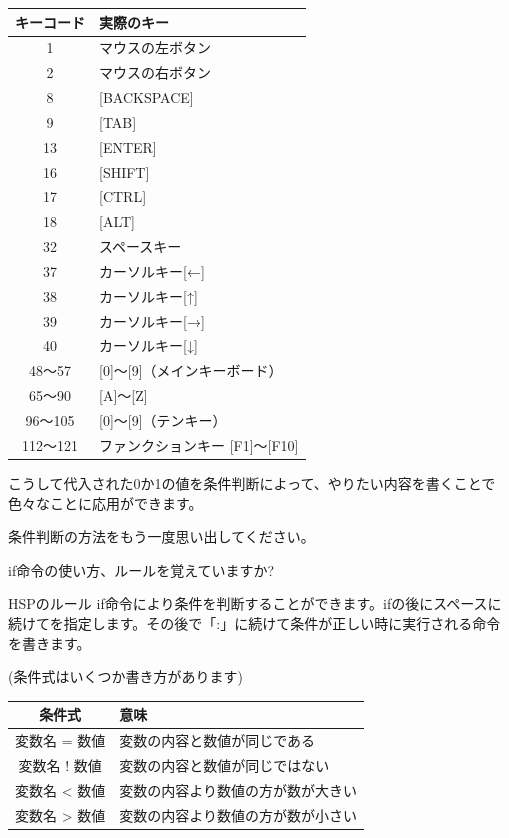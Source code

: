\begin{center}
    \begin{tabular}{c|l} \hline
        キーコード & 実際のキー \\ \hline
        1 & マウスの左ボタン \\
        2 & マウスの右ボタン \\
        8 & [BACKSPACE] \\
        9 & [TAB] \\
        13 & [ENTER] \\
        16 & [SHIFT] \\
        17 & [CTRL] \\
        18 & [ALT] \\
        32 & スペースキー \\
        37 & カーソルキー[←] \\
        38 & カーソルキー[↑] \\
        39 & カーソルキー[→] \\
        40 & カーソルキー[↓] \\
        48〜57 & [0]〜[9]（メインキーボード） \\
        65〜90 & [A]〜[Z] \\
        96〜105 & [0]〜[9]（テンキー） \\
        112〜121 & ファンクションキー [F1]〜[F10] \\ \hline
    \end{tabular}
\end{center}

こうして代入された0か1の値を条件判断によって、やりたい内容を書くことで色々なことに応用ができます。


条件判断の方法をもう一度思い出してください。

if命令の使い方、ルールを覚えていますか?

\begin{itembox}[c]{HSPのルール}
    if命令により条件を判断することができます。ifの後にスペースに続けてを指定します。その後で「:」に続けて条件が正しい時に実行される命令を書きます。
\end{itembox}

\begin{center}
    (条件式はいくつか書き方があります)
\end{center}
\begin{center}
    \begin{tabular}{cl} \hline
        条件式 & 意味 \\ \hline
        変数名 = 数値 & 変数の内容と数値が同じである \\
        変数名 ! 数値 & 変数の内容と数値が同じではない \\
        変数名 {\textless} 数値 & 変数の内容より数値の方が数が大きい \\
        変数名 {\textgreater} 数値 & 変数の内容より数値の方が数が小さい \\ \hline
    \end{tabular}
\end{center}

